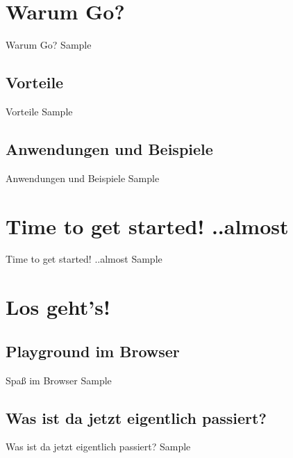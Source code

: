 
\section{Warum Go?}
\begin{frame}{Warum Go?}
	Sample
\end{frame}


\subsection{Vorteile}
\begin{frame}{Vorteile}
	Sample
\end{frame}


\subsection{Anwendungen und Beispiele}
\begin{frame}{Anwendungen und Beispiele}
	Sample
\end{frame}



\section{Time to get started! ..almost}

\begin{frame}{Time to get started! ..almost}
	Sample
\end{frame}




\section{Los geht's!}


\subsection{Playground im Browser}
\begin{frame}{Spaß im Browser}
	Sample
\end{frame}


\subsection{Was ist da jetzt eigentlich passiert?}
\begin{frame}{Was ist da jetzt eigentlich passiert?}
	Sample
\end{frame}


